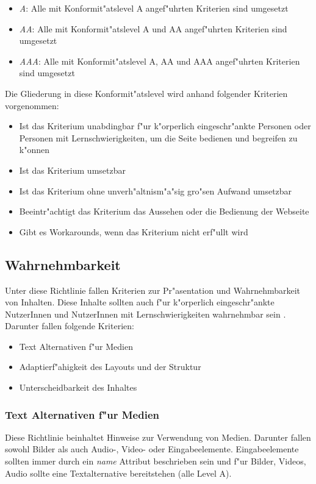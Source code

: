 \documentclass[a4paper,bibtotoc,oneside]{scrbook}
\begin{document}
\begin{itemize}
\item \emph{A}: Alle mit Konformit"atslevel A angef"uhrten Kriterien sind umgesetzt
\item \emph{AA}: Alle mit Konformit"atslevel A und AA angef"uhrten Kriterien sind umgesetzt
\item \emph{AAA}: Alle mit Konformit"atslevel A, AA und AAA angef"uhrten Kriterien sind umgesetzt
\end{itemize}

Die Gliederung in diese Konformit"atslevel wird anhand folgender Kriterien vorgenommen: \cite[Abschnitt Understanding Levels of Conformance]{understand_conform}

\begin{itemize}
\item Ist das Kriterium unabdingbar f"ur k"orperlich eingeschr"ankte Personen oder Personen mit Lernschwierigkeiten, um die Seite bedienen und begreifen zu k"onnen
\item Ist das Kriterium umsetzbar
\item Ist das Kriterium ohne unverh"altnism"a"sig gro"sen Aufwand umsetzbar
\item Beeintr"achtigt das Kriterium das Aussehen oder die Bedienung der Webseite
\item Gibt es Workarounds, wenn das Kriterium nicht erf"ullt wird
\end{itemize}


\subsection{Wahrnehmbarkeit}
Unter diese Richtlinie fallen Kriterien zur Pr"asentation und Wahrnehmbarkeit von Inhalten. Diese Inhalte sollten auch f"ur k"orperlich eingeschr"ankte NutzerInnen und NutzerInnen mit Lernschwierigkeiten wahrnehmbar sein \cite[Abschnitt 1]{wcag2} . Darunter fallen folgende Kriterien: 

\begin{itemize}
\item Text Alternativen f"ur Medien \cite[Abschnitt 1.1 und 1.2]{wcag2}
\item Adaptierf"ahigkeit des Layouts und der Struktur \cite[Abschnitt 1.3]{wcag2}
\item Unterscheidbarkeit des Inhaltes \cite[Abschnitt 1.4]{wcag2}
\end{itemize}

\subsubsection{Text Alternativen f"ur Medien}
Diese Richtlinie beinhaltet Hinweise zur Verwendung von Medien. Darunter fallen sowohl Bilder als auch Audio-, Video- oder Eingabeelemente. Eingabeelemente sollten immer durch ein \emph{name} Attribut beschrieben sein und f"ur Bilder, Videos, Audio sollte eine Textalternative bereitstehen (alle Level A). \cite[Abschnitt 1.1 und 1.2]{wcag2}
\end{document}
